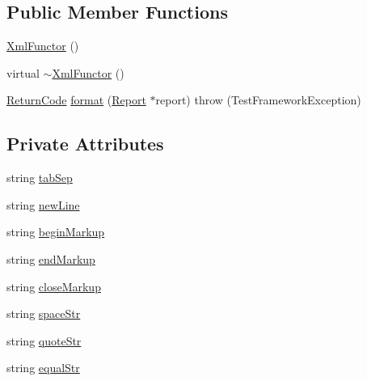 \subsection*{Public Member Functions}
\begin{DoxyCompactItemize}
\item 
\hyperlink{classit_1_1testbench_1_1formatter_1_1XmlFunctor_acd709999f1888003453452e79fe238af}{Xml\-Functor} ()
\item 
virtual \hyperlink{classit_1_1testbench_1_1formatter_1_1XmlFunctor_aa8f212fd51db0eabd195ac00cf1ddce9}{$\sim$\-Xml\-Functor} ()
\item 
\hyperlink{structit_1_1testbench_1_1data_1_1ReturnCode}{Return\-Code} \hyperlink{classit_1_1testbench_1_1formatter_1_1XmlFunctor_acbb02d9ff51defbc6993c0388c54cd6e}{format} (\hyperlink{classit_1_1testbench_1_1data_1_1Report}{Report} $\ast$report)  throw (\-Test\-Framework\-Exception)
\end{DoxyCompactItemize}
\subsection*{Private Attributes}
\begin{DoxyCompactItemize}
\item 
string \hyperlink{classit_1_1testbench_1_1formatter_1_1XmlFunctor_a23d44086211ff4a7dd412bf96a284126}{tab\-Sep}
\item 
string \hyperlink{classit_1_1testbench_1_1formatter_1_1XmlFunctor_af4c7b4e343f365d098a8f2a66bb0da65}{new\-Line}
\item 
string \hyperlink{classit_1_1testbench_1_1formatter_1_1XmlFunctor_a5cdf11ecf35f0470fe04179942d67ae6}{begin\-Markup}
\item 
string \hyperlink{classit_1_1testbench_1_1formatter_1_1XmlFunctor_afaf6e93b9d1b7eadbbac8c0f507acc4f}{end\-Markup}
\item 
string \hyperlink{classit_1_1testbench_1_1formatter_1_1XmlFunctor_a3cc94e6524a110456545511fb54193fc}{close\-Markup}
\item 
string \hyperlink{classit_1_1testbench_1_1formatter_1_1XmlFunctor_abe481c6847da4db016dbcfdd9491aca3}{space\-Str}
\item 
string \hyperlink{classit_1_1testbench_1_1formatter_1_1XmlFunctor_aad00e947b74b40678fd70216d62b7686}{quote\-Str}
\item 
string \hyperlink{classit_1_1testbench_1_1formatter_1_1XmlFunctor_a576b54a739f5cf1c7c38c56bdbb73b10}{equal\-Str}
\end{DoxyCompactItemize}


